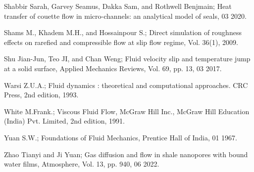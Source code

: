 \documentclass[14pt,one side, a4paper]{extbook}
\begin{document}
\begin{thebibliography}{29}
	 		  Shabbir Sarah, Garvey Seamus, Dakka Sam, and Rothwell Benjmain; Heat transfer of couette flow in micro-channels: an analytical model of seals, 03 2020.
	 		
	 		 Shams M., Khadem M.H., and Hossainpour S.; Direct simulation
	 		of roughness effects on rarefied and compressible flow at slip flow
	 		regime, Vol. 36(1), 2009.
	 		
	 		  Shu Jian-Jun, Teo JI, and Chan Weng; Fluid velocity slip and
	 		temperature jump at a solid surface, Applied Mechanics Reviews, Vol. 
	 		69, pp. 13, 03 2017.
	 		
	 		 Warsi Z.U.A.; Fluid dynamics : theoretical and computational approaches. CRC Press, 2nd edition, 1993.
	 		
	 		 White M.Frank.; Viscous Fluid Flow, McGraw Hill Inc., McGraw Hill Education (India) Pvt. Limited, 2nd edition, 1991.
	 		
	 		 Yuan S.W.; Foundations of Fluid Mechanics, Prentice Hall of
	 		India, 01 1967.
	 		
	 		  Zhao Tianyi and Ji Yuan; Gas diffusion and flow in shale
	 		nanopores with bound water films, Atmosphere, Vol. 13, pp. 940, 06 2022.
	 		
	 		
	 	
 	 	\end{thebibliography}
\end{document}
